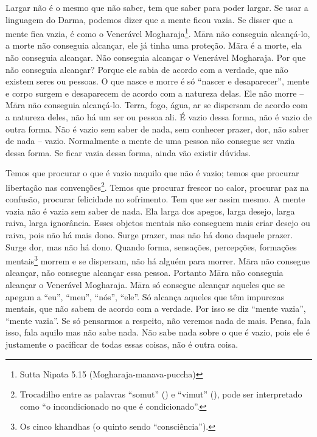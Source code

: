 Largar não é o mesmo que não saber, tem que saber para poder largar.
Se usar a linguagem do Darma, podemos dizer que a mente ficou vazia. Se
disser que a mente fica vazia, é como o Venerável
Mogharaja\footnote{Sutta Nipata 5.15 (Mogharaja-manava-puccha)}. Māra
não conseguia alcançá-lo, a morte não conseguia alcançar, ele já tinha
uma proteção. Māra é a morte, ela não conseguia alcançar. Não
conseguia alcançar o Venerável Mogharaja. Por que não conseguia
alcançar? Porque ele sabia de acordo com a verdade, que não existem
seres ou pessoas. O que nasce e morre é só “nascer e desaparecer”,
mente e corpo surgem e desaparecem de acordo com a natureza delas. Ele
não morre – Māra não conseguia alcançá-lo. Terra, fogo, água, ar se
dispersam de acordo com a natureza deles, não há um ser ou pessoa ali.
É vazio dessa forma, não é vazio de outra forma. Não é vazio sem saber
de nada, sem conhecer prazer, dor, não saber de nada – vazio.
Normalmente a mente de uma pessoa não consegue ser vazia dessa forma.
Se ficar vazia dessa forma, ainda vão existir dúvidas. 

Temos que procurar o que é vazio naquilo que não é vazio; temos que
procurar libertação nas convenções\footnote{Trocadilho entre as
palavras “somut” () e “vimut”
(), pode ser interpretado como “o
incondicionado no que é condicionado”.}. Temos que procurar frescor no
calor, procurar paz na confusão, procurar felicidade no sofrimento. Tem
que ser assim mesmo. A mente vazia não é vazia sem saber de nada. Ela
larga dos apegos, larga desejo, larga raiva, larga ignorância. Esses
objetos mentais não conseguem mais criar desejo ou raiva, pois não há
mais dono. Surge prazer, mas não há dono daquele prazer. Surge dor, mas
não há dono. Quando forma, sensações, percepções, formações
mentais\footnote{Os cinco khandhas (o quinto sendo “consciência”).}
morrem e se dispersam, não há alguém para morrer. Māra não consegue
alcançar, não consegue alcançar essa pessoa. Portanto Māra não
conseguia alcançar o Venerável Mogharaja. Māra só consegue alcançar
aqueles que se apegam a “eu”, “meu”, “nós”, “ele”. Só alcança aqueles
que têm impurezas mentais, que não sabem de acordo com a verdade. Por
isso se diz “mente vazia”, “mente vazia”. Se só pensarmos a respeito,
não veremos nada de mais. Pensa, fala isso, fala aquilo mas não sabe
nada. Não sabe nada sobre o que é vazio, pois ele é justamente o
pacificar de todas essas coisas, não é outra coisa. 

